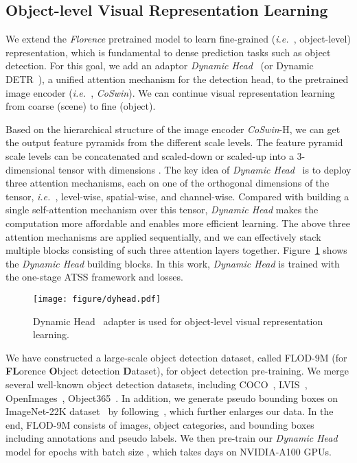 \documentclass{article}
\newcommand{\ie}{{\it{i.e.}~}}
\begin{document}
\subsection{Object-level Visual Representation Learning}

We extend the \emph{Florence} pretrained model to learn fine-grained (\ie, object-level) representation, which is fundamental to
dense prediction tasks such as object detection. For this goal, we add an adaptor \emph{Dynamic Head}~\cite{Dai_2021_CVPR} (or Dynamic DETR~\cite{Dai_2021_ICCV}), a unified attention
mechanism for the detection head, to the pretrained image encoder (\ie, \emph{CoSwin}). We can continue visual representation learning from coarse (scene) to fine (object).

Based on the hierarchical structure of the image encoder \emph{CoSwin}-H, we can get the output
feature pyramids from the different scale levels. The feature pyramid scale levels can be concatenated and
scaled-down or scaled-up into a 3-dimensional tensor with dimensions . The key idea of \emph{Dynamic Head}~\cite{Dai_2021_CVPR} is to deploy three attention
mechanisms, each on one of the orthogonal dimensions of the tensor, \ie, level-wise, spatial-wise, and
channel-wise. Compared with building a single self-attention mechanism over this tensor, \emph{Dynamic
Head} makes the computation more affordable and enables more efficient learning. The above three
attention mechanisms are applied sequentially, and we can effectively stack multiple blocks
consisting of such three attention layers together. Figure~\ref{fig:dyhead} shows the \emph{Dynamic
Head} building blocks. In this work, \emph{Dynamic Head} is trained with the one-stage ATSS
framework and losses.

\begin{figure}[t]
  \centering
   \texttt{[image: figure/dyhead.pdf]}
  \caption{Dynamic Head~\cite{Dai_2021_CVPR} adapter is used for object-level visual representation learning.}
  \label{fig:dyhead}
\end{figure}


We have constructed a large-scale object detection dataset, called FLOD-9M (for {\bf{FL}}orence {\bf{O}}bject detection {\bf{D}}ataset), for object detection
pre-training. We merge several well-known object detection datasets, including
COCO~\cite{lin2015microsoft}, LVIS~\cite{Gupta_2019_CVPR}, OpenImages~\cite{openimages},
Object365~\cite{Shao_2019_ICCV}. In addition, we generate pseudo bounding boxes on ImageNet-22K
dataset~\cite{deng2009imagenet} by following~\cite{ZophGLCLC020_nips}, which further enlarges our
data. In the end, FLOD-9M consists of  images,  object categories, and
 bounding boxes including annotations and pseudo labels. We then pre-train our
\emph{Dynamic Head} model for  epochs with batch size , which takes  days on 
NVIDIA-A100 GPUs.
\end{document}
